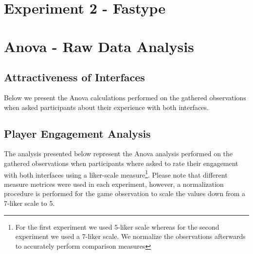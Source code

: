 

\chapter{Experiment 2 - Fastype}
\label{appendix2:fastype}







\chapter{Anova - Raw Data Analysis}
\label{appendix3:chapter}


\section{Attractiveness of Interfaces}
\label{appendix3:attractiveness_analysis}
Below we present the Anova calculations performed on the gathered observations when asked participants about their experience with both interfaces. 



\section{Player Engagement Analysis}
\label{appendix3:engagement_analysis}
The analysis presented below represent the Anova analysis performed on the gathered observations when participants where asked to rate their engagement with both interfaces using a liker-scale measure\footnote{For the first experiment we used 5-liker scale whereas for the second experiment we used a 7-liker scale. We normalize the observations afterwards to accurately perform comparison measures}. Please note that different measure metrices were used in each experiment, however, a normalization procedure is performed for the game observation to scale the values down from a 7-liker scale to 5. 


